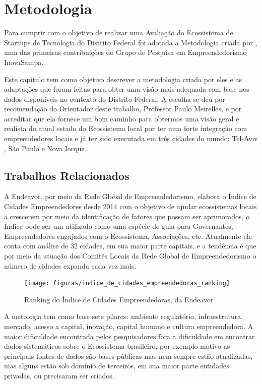 \chapter[Metodologia]{Metodologia}
\label{cap-metodologia}

Para cumprir com o objetivo de realizar uma Avaliação do Ecossistema de Startups de Tecnologia do Distrito Federal foi adotada a Metodologia criada por , uma das primeiras contribuições do Grupo de Pesquisa em Empreendedorismo InovaSampa. 

Este capítulo tem como objetivo descrever a metodologia criada por eles e as adaptações que foram feitas para obter uma visão mais adequada com base nos dados disponíveis no contexto do Distrito Federal. A escolha se deu por recomendação do Orientador deste trabalho, Professor Paulo Meirelles, e por acreditar que ela fornece um bom caminho para obtermos uma visão geral e realista do atual estado do Ecossistema local por ter uma forte integração com empreendedores locais e já ter sido executada em três cidades do mundo: Tel-Aviv , São Paulo  e Nova Iorque . 

\section{Trabalhos Relacionados}
\label{section:trabalhos_relacionados}

A Endeavor, por meio da Rede Global de Empreendedorismo, elabora o Índice de Cidades Empreendedores desde 2014 com o objetivo de ajudar ecossistemas locais a crescerem por meio da identificação de fatores que possam ser aprimorados, o Índice pode ser um utilizado como uma espécie de guia para Governantes, Empreendedores engajados com o Ecossistema, Associações, etc. Atualmente ele conta com análise de 32 cidades, em sua maior parte capitais, e a tendência é que por meio da atuação dos Comitês Locais da Rede Global de Empreendedorismo o número de cidades expanda cada vez mais.

\begin{figure}[!htb]
\centering
\texttt{[image: figuras/indice\_de\_cidades\_empreendedoras\_ranking]}
\caption{Ranking do Índice de Cidades Empreendedoras, da Endeavor}
\label{Rotulo}
\end{figure}

A metologia tem como base sete pilares: ambiente regulatório, infraestrutura, mercado, acesso a capital, inovação, capital humano e cultura empreendedora. A maior dificuldade encontrada pelos pesquisadores fora a dificuldade em encontrar dados sistemáticos sobre o Ecossistema brasileiro, por exemplo motivo as principais fontes de dados são bases públicas mas nem sempre estão atualizadas, mas alguns estão sob domínio de terceiros, em sua maior parte entidades privadas, ou precisaram ser criados. 

